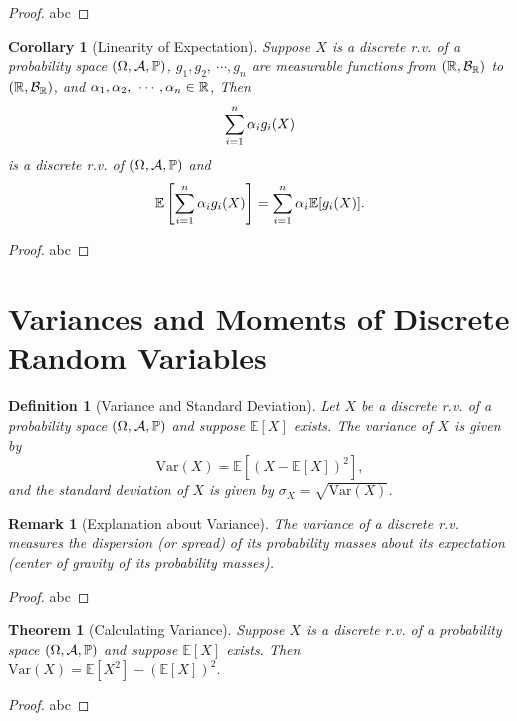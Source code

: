 \documentclass[openany,12pt]{book}
\newtheorem{theorem}{Theorem}[chapter]
\newtheorem{corollary}{Corollary}[chapter]
\newtheorem{remark}{Remark}[chapter]
\newtheorem{definition}{Definition}[chapter]
\begin{document}
\begin{proof}
  abc
\end{proof}

\begin{corollary}[Linearity of Expectation]
Suppose $X$ is a discrete r.v. of a probability space $(\Omega,\mathcal{A},\mathbb{P})$,
$g_1,g_2,\ \cdots,g_n$ are measurable functions from $(\mathbb{R},\mathcal{B}_{\mathbb{R}})$ to $(\mathbb{R},\mathcal{B}_{\mathbb{R}})$, and $\alpha_1,\alpha_2,\ \cdots,\alpha_n\in\mathbb{R}$, Then
$$
\sum_{i=1}^{n}\alpha_i  g_i (X)
$$
is a discrete r.v. of $(\Omega,\mathcal{A},\mathbb{P})$ and 
$$
\mathbb{E}\left[\sum_{i=1}^{n}\alpha_i  g_i (X)\right]=\sum_{i=1}^{n}\alpha_i  \mathbb{E}[g_i (X)].
$$
\end{corollary}

\begin{proof}
  abc
\end{proof}

\section{Variances and Moments of Discrete Random Variables}

\begin{definition}[Variance and Standard Deviation]
Let $X$ be a discrete r.v. of a probability space $(\Omega,\mathcal{A},\mathbb{P})$ and suppose $\mathbb{E}[X]$ exists. The variance of $X$ is given by $$\mathrm{Var}(X)=\mathbb{E}[(X-\mathbb{E}[X])^2],$$ and the standard deviation of $X$ is given by $\sigma_X=\sqrt{\mathrm{Var}(X)}$.
\end{definition}

\begin{remark}[Explanation about Variance]
The variance of a discrete r.v. measures the dispersion (or spread) of its probability masses about its expectation (center of gravity of its probability masses).
\end{remark}

\begin{proof}
  abc
\end{proof}

\begin{theorem}[Calculating Variance]
Suppose $X$ is a discrete r.v. of a probability space $(\Omega,\mathcal{A},\mathbb{P})$ and suppose $\mathbb{E}[X]$ exists. Then $\mathrm{Var}(X)=\mathbb{E}[X^2]-(\mathbb{E}[X])^2$.
\end{theorem}

\begin{proof}
  abc
\end{proof}
\end{document}
